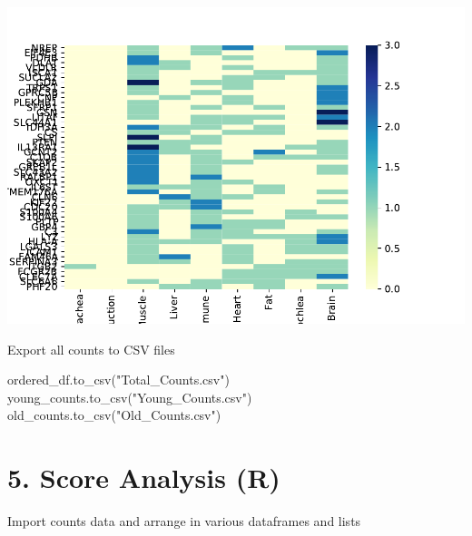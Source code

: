 \documentclass[
]{article}
\newenvironment{Shaded}{\begin{snugshade}}{\end{snugshade}}
\newcommand{\NormalTok}[1]{#1}
\newcommand{\StringTok}[1]{\textcolor[rgb]{0.31,0.60,0.02}{#1}}
\begin{document}
\includegraphics{Thesis_DualCodeTest_files/figure-latex/unnamed-chunk-31-1.pdf}

Export all counts to CSV files

\begin{Shaded}
\begin{Highlighting}[]
\NormalTok{ordered_df.to_csv(}\StringTok{"Total_Counts.csv"}\NormalTok{)}
\NormalTok{young_counts.to_csv(}\StringTok{"Young_Counts.csv"}\NormalTok{)}
\NormalTok{old_counts.to_csv(}\StringTok{"Old_Counts.csv"}\NormalTok{)}
\end{Highlighting}
\end{Shaded}

\hypertarget{score-analysis-r}{%
\section{5. Score Analysis (R)}\label{score-analysis-r}}

Import counts data and arrange in various dataframes and lists
\end{document}
